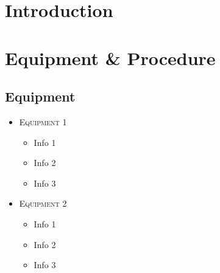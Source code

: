 \documentclass[12pt, letterpaper]{article}
\begin{document}
	\section{Introduction}\hspace{2.6ex}
			\label{}
			\lipsum[29-32] %
        
	\section{Equipment \& Procedure}\label{}
		\subsection{Equipment}\hspace{2.6ex}
			\lipsum[4-7] %
			\begin{itemize}
				\item
				{
					\textsc{Equipment 1}
					\begin{itemize}
						\item Info 1
						\item Info 2
						\item Info 3
					\end{itemize}
				}
				\item
				{
					\textsc{Equipment 2}
					\begin{itemize}
						\item Info 1
						\item Info 2
						\item Info 3
					\end{itemize}
				}
			\end{itemize}
\end{document}

